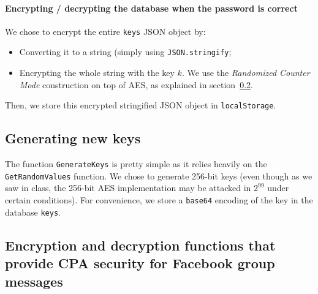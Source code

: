\documentclass[10pt,twocolumn]{article}
\begin{document}
\paragraph{Encrypting / decrypting the database when the password is correct}
We chose to encrypt the entire \texttt{keys} JSON object by:
\begin{itemize}
  \item Converting it to a string (simply using \texttt{JSON.stringify};
  \item Encrypting the whole string with the key $k$. We use the \textit{Randomized Counter Mode} construction on top of AES, as explained in section~\ref{encryption-decryption}.
\end{itemize}
Then, we store this encrypted stringified JSON object in \texttt{localStorage}.



\subsection{Generating new keys}
The function \texttt{GenerateKeys} is pretty simple as it relies heavily on the \texttt{GetRandomValues} function. We chose to generate 256-bit keys (even though as we saw in class, the 256-bit AES implementation may be attacked in $2^{99}$ under certain conditions). For convenience, we store a \texttt{base64} encoding of the key in the database \texttt{keys}.



\subsection{Encryption and decryption functions that provide CPA security for Facebook group messages}\label{encryption-decryption}
\end{document}
